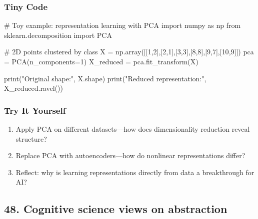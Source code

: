 \documentclass[
  letterpaper,
  DIV=11,
  numbers=noendperiod]{scrreprt}
\newenvironment{Shaded}{\begin{snugshade}}{\end{snugshade}}
\newcommand{\BuiltInTok}[1]{\textcolor[rgb]{0.00,0.23,0.31}{#1}}
\newcommand{\CommentTok}[1]{\textcolor[rgb]{0.37,0.37,0.37}{#1}}
\newcommand{\DecValTok}[1]{\textcolor[rgb]{0.68,0.00,0.00}{#1}}
\newcommand{\ImportTok}[1]{\textcolor[rgb]{0.00,0.46,0.62}{#1}}
\newcommand{\NormalTok}[1]{\textcolor[rgb]{0.00,0.23,0.31}{#1}}
\newcommand{\OperatorTok}[1]{\textcolor[rgb]{0.37,0.37,0.37}{#1}}
\newcommand{\StringTok}[1]{\textcolor[rgb]{0.13,0.47,0.30}{#1}}
\providecommand{\tightlist}{%
  \setlength{\itemsep}{0pt}\setlength{\parskip}{0pt}}
\begin{document}
\subsubsection{Tiny Code}\label{tiny-code-46}

\begin{Shaded}
\begin{Highlighting}[]
\CommentTok{\# Toy example: representation learning with PCA}
\ImportTok{import}\NormalTok{ numpy }\ImportTok{as}\NormalTok{ np}
\ImportTok{from}\NormalTok{ sklearn.decomposition }\ImportTok{import}\NormalTok{ PCA}

\CommentTok{\# 2D points clustered by class}
\NormalTok{X }\OperatorTok{=}\NormalTok{ np.array([[}\DecValTok{1}\NormalTok{,}\DecValTok{2}\NormalTok{],[}\DecValTok{2}\NormalTok{,}\DecValTok{1}\NormalTok{],[}\DecValTok{3}\NormalTok{,}\DecValTok{3}\NormalTok{],[}\DecValTok{8}\NormalTok{,}\DecValTok{8}\NormalTok{],[}\DecValTok{9}\NormalTok{,}\DecValTok{7}\NormalTok{],[}\DecValTok{10}\NormalTok{,}\DecValTok{9}\NormalTok{]])}
\NormalTok{pca }\OperatorTok{=}\NormalTok{ PCA(n\_components}\OperatorTok{=}\DecValTok{1}\NormalTok{)}
\NormalTok{X\_reduced }\OperatorTok{=}\NormalTok{ pca.fit\_transform(X)}

\BuiltInTok{print}\NormalTok{(}\StringTok{"Original shape:"}\NormalTok{, X.shape)}
\BuiltInTok{print}\NormalTok{(}\StringTok{"Reduced representation:"}\NormalTok{, X\_reduced.ravel())}
\end{Highlighting}
\end{Shaded}

\subsubsection{Try It Yourself}\label{try-it-yourself-46}

\begin{enumerate}
\def\labelenumi{\arabic{enumi}.}
\tightlist
\item
  Apply PCA on different datasets---how does dimensionality reduction
  reveal structure?
\item
  Replace PCA with autoencoders---how do nonlinear representations
  differ?
\item
  Reflect: why is learning representations directly from data a
  breakthrough for AI?
\end{enumerate}

\subsection{48. Cognitive science views on
abstraction}\label{cognitive-science-views-on-abstraction}
\end{document}
